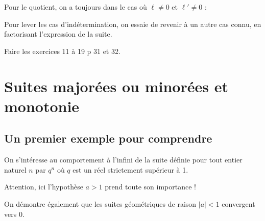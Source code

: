 \documentclass[12pt,a4paper]{article}
\newcommand{\vabs}[1]{\left\lvert #1 \right\rvert}
\theoremstyle{break}
\theoremstyle{plain}
\theoremstyle{nonumberplain}
\theoremstyle{nonumberbreak}
\begin{document}
Pour le quotient, on a toujours dans le cas où $\ell \neq 0$ et $\ell'
\neq 0$ :
\begin{center}
  \renewcommand{\arraystretch}{1.2}
\end{center}

Pour lever les cas d'indétermination, on essaie de revenir à un autre
cas connu, en factorisant l'expression de la suite.

Faire les exercices 11 à 19 p 31 et 32.

\pagebreak

\section{Suites majorées ou minorées et monotonie}

\subsection{Un premier exemple pour comprendre}

On s'intéresse au comportement à l'infini de la suite définie pour tout
entier naturel $n$ par $q^n$ où $q$ est un réel strictement supérieur à
1.


Attention, ici l'hypothèse $a>1$ prend toute son importance !


On démontre également que les suites géométriques de raison $\vabs{a} <
1$ convergent vers 0.
\end{document}
